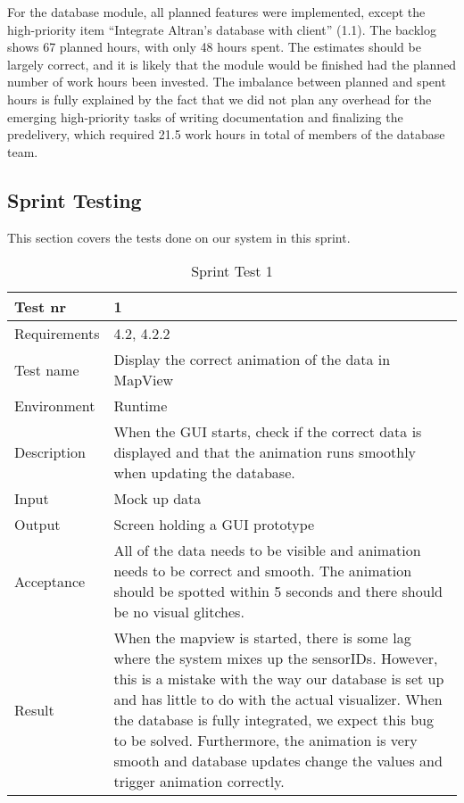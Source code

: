 \documentclass[../document]{subfiles}
\begin{document}
For the database module, all planned features were implemented, except the high-priority item “Integrate Altran's database with client” (1.1). The backlog shows 67 planned hours, with only 48 hours spent. The estimates should be largely correct, and it is likely that the module would be finished had the planned number of work hours been invested. The imbalance between planned and spent hours is fully explained by the fact that we did not plan any overhead for the emerging high-priority tasks of writing documentation and finalizing the predelivery, which required 21.5 work hours in total of members of the database team.

\subsection{Sprint Testing}
This section covers the tests done on our system in this sprint.

\begin{table}[H]
\caption{Sprint Test 1}
\centering
\begin{tabularx}{\textwidth}{|l|X|}
\hline
Test nr
&1
\\ \hline Requirements
&4.2, 4.2.2
\\ \hline Test name
&Display the correct animation of the data in MapView
\\ \hline Environment
&Runtime
\\ \hline Description
&When the GUI starts, check if the correct data is displayed and that the animation runs smoothly when updating the database.
\\ \hline Input
&Mock up data
\\ \hline Output
&Screen holding a GUI prototype
\\ \hline Acceptance
&All of the data needs to be visible and animation needs to be correct and smooth. The animation should be spotted within 5 seconds and there should be no visual glitches.
\\ \hline Result
&When the mapview is started, there is some lag where the system mixes up the sensorIDs. However, this is a mistake with the way our database is set up and has little to do with the actual visualizer. When the database is fully integrated, we expect this bug to be solved. Furthermore, the animation is very smooth and database updates change the values and trigger animation correctly.
\\ \hline 
\end{tabularx}
\end{table}
\end{document}
